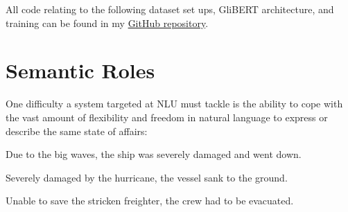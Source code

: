 All code relating to the following dataset set ups, GliBERT architecture, and training can be found in
my \href{https://github.com/JonathanSchaber/Masterarbeit}{GitHub repository}.


\section{Semantic Roles}
\label{sec:semantic-roles}



One difficulty a system targeted at NLU must tackle is the ability to cope with the vast amount of
flexibility and freedom in natural language to express or describe the same state of affairs:

\begin{examples}
  \item Due to the big waves, the ship was severely damaged and went down.
  \item \label{ex:sinking-sent} Severely damaged by the hurricane, the vessel sank to the ground.
  \item Unable to save the stricken freighter, the crew had to be evacuated.
\end{examples}

